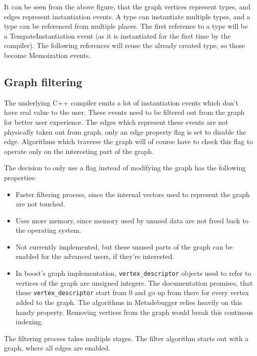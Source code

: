 \noindent
It can be seen from the above figure, that the graph vertices represent types,
and edges represent instantiation events. A type can instantiate multiple
types, and a type can be referenced from multiple places. The first reference
to a type will be a TempateInstantiation event (as it is instantiated for the
first time by the compiler). The following references will reuse the already
created type, so those become Memoization events.

\subsection{Graph filtering} \label{graph-filtering}

The underlying C++ compiler emits a lot of instantiation events which don't
have real value to the user. These events need to be filtered out from the
graph for better user experience. The edges which represent these events are
not physically taken out from graph, only an edge property flag is set to
disable the edge. Algorithms which traverse the graph will of course have to
check this flag to operate only on the interesting part of the graph.

The decision to only use a flag instead of modifying the graph has the
following properties:

\begin{itemize}
    \item
        Faster filtering process, since the internal vectors used to represent
        the graph are not touched.
    \item
        Uses more memory, since memory used by unused data are not freed back
        to the operating system.
    \item
        Not currently implemented, but these unused parts of the graph can be
        enabled for the advanced users, if they're interested.
    \item
        In boost's graph implementation, \texttt{vertex\_descriptor}
        objects used to refer to vertices of the graph are unsigned integers.
        The documentation promises, that these \texttt{vertex\_descriptor}
        start from 0 and go up from there for every vertex added to the graph.
        The algorithms in Metadebugger relies heavily on this handy property.
        Removing vertices from the graph would break this continous indexing.
\end{itemize}

The filtering process takes multiple stages. The filter algorithm starts out
with a graph, where all edges are enabled.

